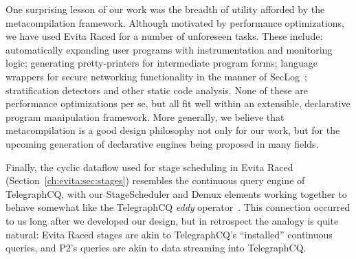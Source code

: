 One surprising lesson of our work was the breadth of utility afforded by the
metacompilation framework.  Although motivated by performance optimizations, we
have used Evita Raced for a number of unforeseen tasks.  These include:
automatically expanding user programs with instrumentation and monitoring
logic; generating pretty-printers for intermediate program forms; language
wrappers for secure networking functionality in the manner of
SecLog~\cite{abadi-netdb07}; stratification detectors and other static code
analysis.  None of these are performance optimizations per se, but all fit well
within an extensible, declarative program manipulation framework.  More
generally, we believe that metacompilation is a good design philosophy not only
for our work, but for the upcoming generation of declarative engines being
proposed in many fields.

Finally, the cyclic dataflow used for stage scheduling in Evita Raced
(Section~\ref{ch:evita:sec:stages}) resembles the continuous query engine of
TelegraphCQ, with our StageScheduler and Demux elements working together to
behave somewhat like the TelegraphCQ {\em eddy} operator~\cite{tcq-cidr}.  This
connection occurred to us long after we developed our design, but in retrospect
the analogy is quite natural: Evita Raced stages are akin to TelegraphCQ's
``installed'' continuous queries, and P2's \OVERLOG queries are akin to data
streaming into TelegraphCQ.

